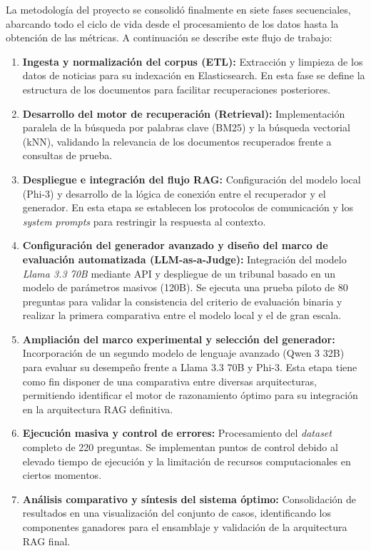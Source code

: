 La metodología del proyecto se consolidó finalmente en siete fases secuenciales, abarcando todo el ciclo de vida desde el procesamiento de los datos hasta la obtención de las métricas. A continuación se describe este flujo de trabajo:

\begin{enumerate}
    \item \textbf{Ingesta y normalización del corpus (ETL):} Extracción y limpieza de los datos de noticias para su indexación en Elasticsearch. En esta fase se define la estructura de los documentos para facilitar recuperaciones posteriores.
    \item \textbf{Desarrollo del motor de recuperación (Retrieval):} Implementación paralela de la búsqueda por palabras clave (BM25) y la búsqueda vectorial (kNN), validando la relevancia de los documentos recuperados frente a consultas de prueba.
    \item \textbf{Despliegue e integración del flujo RAG:} Configuración del modelo local (Phi-3) y desarrollo de la lógica de conexión entre el recuperador y el generador. En esta etapa se establecen los protocolos de comunicación y los \textit{system prompts} para restringir la respuesta al contexto.
    \item \textbf{Configuración del generador avanzado y diseño del marco de evaluación automatizada (LLM-as-a-Judge):} Integración del modelo \textit{Llama 3.3 70B} mediante API y despliegue de un tribunal basado en un modelo de parámetros masivos (120B). Se ejecuta una prueba piloto de 80 preguntas para validar la consistencia del criterio de evaluación binaria y realizar la primera comparativa entre el modelo local y el de gran escala.
    \item \textbf{Ampliación del marco experimental y selección del generador:} Incorporación de un segundo modelo de lenguaje avanzado (Qwen 3 32B) para evaluar su desempeño frente a Llama 3.3 70B y Phi-3. Esta etapa tiene como fin disponer de una comparativa entre diversas arquitecturas, permitiendo identificar el motor de razonamiento óptimo para su integración en la arquitectura RAG definitiva.
    \item \textbf{Ejecución masiva y control de errores:} Procesamiento del \textit{dataset} completo de 220 preguntas. Se implementan puntos de control debido al elevado tiempo de ejecución y la limitación de recursos computacionales en ciertos momentos.
    \item \textbf{Análisis comparativo y síntesis del sistema óptimo:} Consolidación de resultados en una visualización del conjunto de casos, identificando los componentes ganadores para el ensamblaje y validación de la arquitectura RAG final.
\end{enumerate}